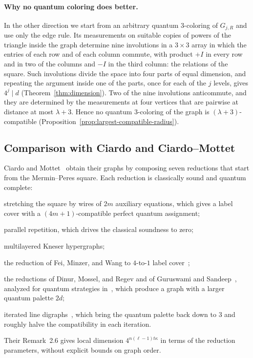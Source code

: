 \paragraph{Why no quantum coloring does better.}
In the other direction we start from an arbitrary quantum $3$-coloring of $G_{j,R}$ and use only the edge rule. Its measurements on suitable copies of powers of the triangle inside the graph determine nine involutions in a $3\times3$ array in which the entries of each row and of each column commute, with product $+I$ in every row and in two of the columns and $-I$ in the third column: the relations of the square. Such involutions divide the space into four parts of equal dimension, and repeating the argument inside one of the parts, once for each of the $j$ levels, gives $4^j\mid d$ (Theorem~\ref{thm:dimension}). Two of the nine involutions anticommute, and they are determined by the measurements at four vertices that are pairwise at distance at most $\lambda+3$. Hence no quantum $3$-coloring of the graph is $(\lambda+3)$-compatible (Proposition~\ref{prop:largest-compatible-radius}).

\subsection{Comparison with Ciardo and Ciardo--Mottet}\label{sec:comparison}

Ciardo and Mottet~\cite[Table~1 and Section~3]{CM} obtain their graphs by composing seven reductions that start from the Mermin--Peres square. Each reduction is classically sound and quantum complete:
\begin{list}{}{\setlength{\labelwidth}{3.6em}\setlength{\labelsep}{0.6em}\setlength{\leftmargin}{4.8em}\setlength{\itemsep}{2pt}\setlength{\parsep}{0pt}\setlength{\topsep}{4pt}}
\item[\textup{(i)}] stretching the square by wires of $2m$ auxiliary equations, which gives a label cover with a $(4m+1)$-compatible perfect quantum assignment;
\item[\textup{(ii)}] parallel repetition, which drives the classical soundness to zero;
\item[\textup{(iii)}] multilayered Kneser hypergraphs;
\item[\textup{(iv)}] the reduction of Fei, Minzer, and Wang to $4$-to-$1$ label cover~\cite{FMW};
\item[\textup{(v)--(vi)}] the reductions of Dinur, Mossel, and Regev and of Guruswami and Sandeep~\cite{DMR,GS}, analyzed for quantum strategies in~\cite[Sections~5.1--5.2]{C26}, which produce a graph with a larger quantum palette $2d$;
\item[\textup{(vii)}] iterated line digraphs~\cite[Sections~5.3--5.4]{C26}, which bring the quantum palette back down to $3$ and roughly halve the compatibility in each iteration.
\end{list}
Their Remark~2.6 gives local dimension $4^{n(\ell-1)t\kappa}$ in terms of the reduction parameters, without explicit bounds on graph order.

